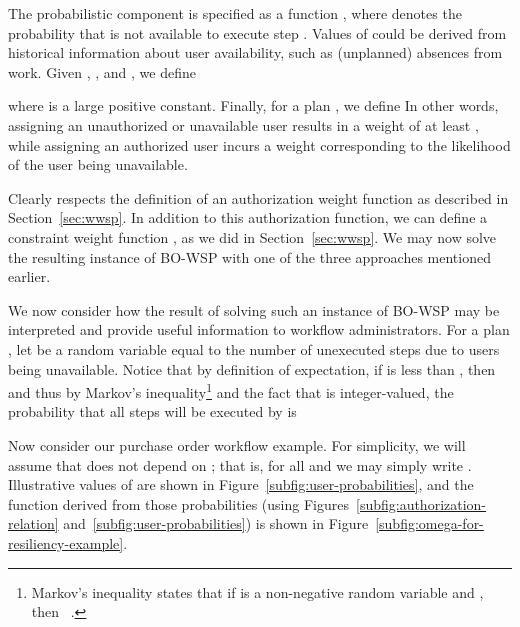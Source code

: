 \documentclass[jcs,crcready]{iosart1c}
\newcommand{\BOWSP}{\textsc{BO-WSP}\xspace}
\begin{document}
The probabilistic component is specified as a function , where  denotes the probability that  is not available to execute step . 
Values of  could be derived from historical information about user availability, such as (unplanned) absences from work.
Given , ,  and , we define
 
where  is a large positive constant.
Finally, for a plan , we define 
In other words, assigning an unauthorized or unavailable user results in a weight of at least , while assigning an authorized user incurs a weight corresponding to the likelihood of the user being unavailable. 

Clearly  respects the definition of an authorization weight function as described in Section~\ref{sec:wwsp}.
In addition to this authorization function, we can define a constraint weight function , as we did in Section~\ref{sec:wwsp}.
We may now solve the resulting instance of \BOWSP with one of the three approaches mentioned earlier.
 
We now consider how the result of solving such an instance of \BOWSP may be interpreted and provide useful information to workflow administrators.
For a plan , let  be a random variable equal to the number of unexecuted steps due to users being unavailable. 
Notice that by definition of expectation, if  is less than , then  and thus by Markov's inequality\footnote{Markov's inequality states that if  is a non-negative random variable and , then ~\cite{Weisstein}.} and the fact that  is integer-valued, the probability that  all steps will be executed by  is 
 

Now consider our purchase order workflow example.
For simplicity, we will assume that  does not depend on ; that is,  for all  and we may simply write .
Illustrative values of  are shown in Figure~\ref{subfig:user-probabilities}, and the function  derived from those probabilities (using Figures~\ref{subfig:authorization-relation} and~\ref{subfig:user-probabilities}) is shown in Figure~\ref{subfig:omega-for-resiliency-example}. 
\end{document}
